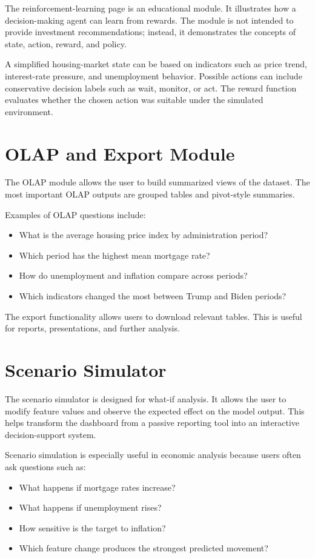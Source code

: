 The reinforcement-learning page is an educational module. It illustrates how a decision-making agent can learn from rewards. The module is not intended to provide investment recommendations; instead, it demonstrates the concepts of state, action, reward, and policy.

A simplified housing-market state can be based on indicators such as price trend, interest-rate pressure, and unemployment behavior. Possible actions can include conservative decision labels such as wait, monitor, or act. The reward function evaluates whether the chosen action was suitable under the simulated environment.

\section{OLAP and Export Module}

The OLAP module allows the user to build summarized views of the dataset. The most important OLAP outputs are grouped tables and pivot-style summaries.

Examples of OLAP questions include:
\begin{itemize}
\item What is the average housing price index by administration period?
\item Which period has the highest mean mortgage rate?
\item How do unemployment and inflation compare across periods?
\item Which indicators changed the most between Trump and Biden periods?
\end{itemize}

The export functionality allows users to download relevant tables. This is useful for reports, presentations, and further analysis.

\section{Scenario Simulator}

The scenario simulator is designed for what-if analysis. It allows the user to modify feature values and observe the expected effect on the model output. This helps transform the dashboard from a passive reporting tool into an interactive decision-support system.

Scenario simulation is especially useful in economic analysis because users often ask questions such as:
\begin{itemize}
\item What happens if mortgage rates increase?
\item What happens if unemployment rises?
\item How sensitive is the target to inflation?
\item Which feature change produces the strongest predicted movement?
\end{itemize}

